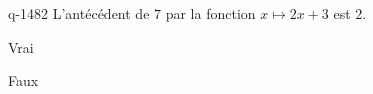 \begin{truefalse}{q-1482}
L'antécédent de $7$ par la fonction $x\mapsto 2x+3$ est $2$.
\item* Vrai
\item Faux
\end{truefalse}

